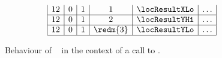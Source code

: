 \begin{figure}[h!]
\[\begin{array}{|c|c|c|c|c|c|c|}
            12                        & 0                                  & 1                                    & 1                      & \locResultXLo & \hdots                                                                                 \\ \hline
            12                        & 0                                  & 1                                    & 2                      & \locResultYHi & \hdots                                                                                 \\ \hline
            12                        & 0                                  & 1                                    & \redm{3}               & \locResultYLo & \hdots                                                                                 \\ \hline
        \end{array}
    \]
    \caption{Behaviour of \hurdle ~ in the context of a call to .}
\end{figure}




